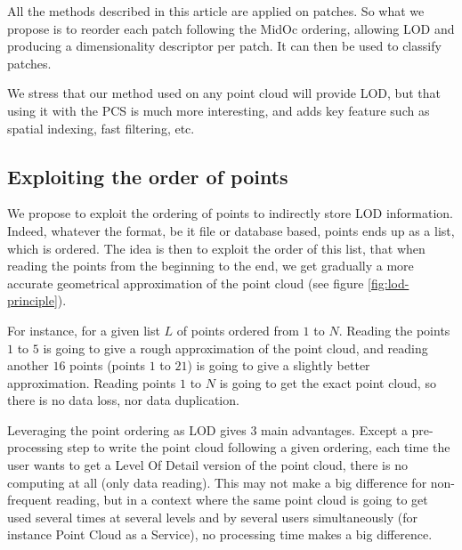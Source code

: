 		All the methods described in this article are applied on patches.
		So what we propose is to reorder each patch following the MidOc ordering, allowing LOD and producing a dimensionality descriptor per patch. It can then be used to classify patches.
		
		We stress that our method used on any point cloud will provide LOD,
		but that using it with the PCS is much more interesting,
		and adds key feature such as spatial indexing, fast filtering, etc. 
 
 	 
	 	 
	\subsection{Exploiting the order of points}
		\label{method.order}
			
			
			We propose to exploit the ordering of points to indirectly store LOD information.
			Indeed, whatever the format, be it file or database based, points ends up as a list, which is ordered. 
			The idea is then to exploit the order of this list, 
			that when reading the points from the beginning to the end, we get gradually a more accurate geometrical approximation of the point cloud (see figure \ref{fig:lod-principle}). 
			 
			For instance, for a given list $L$ of points ordered from $1$ to $N$.
			Reading the points $1$ to $5$ is going to give a rough approximation of the point cloud, and reading another $16$ points (points $1$ to $21$) is going to give a slightly better approximation. Reading points $1$ to $N$ is going to get the exact point cloud, so there is no data loss, nor data duplication.
		 
			Leveraging the point ordering as LOD gives 3 main advantages.
			Except a pre-processing step to write the point cloud following a given ordering, each time the user wants to get a Level Of Detail version of the point cloud, there is no computing at all (only data reading).
			This may not make a big difference for non-frequent reading, but in a context where the same point cloud is going to get used several times at several levels and by several users simultaneously (for instance Point Cloud as a Service), no processing time makes a big difference.
		
